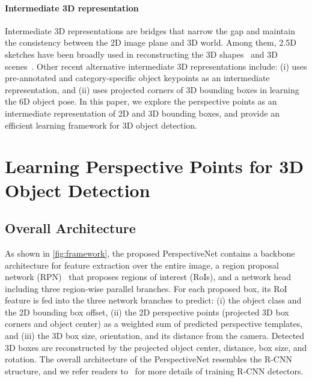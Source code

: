 \documentclass{article}
\begin{document}
\paragraph{Intermediate 3D representation}

Intermediate 3D representations are bridges that narrow the gap and maintain the consistency between the 2D image plane and 3D world. Among them, 2.5D sketches have been broadly used in reconstructing the 3D shapes~\cite{wu2017marrnet,von2018,genre2018} and 3D scenes~\cite{tulsiani2017factoring,huang2018holistic}. Other recent alternative intermediate 3D representations include: (i) \citet{wu2016single} uses pre-annotated and category-specific object keypoints as an intermediate representation, and (ii) \citet{tekin2018real} uses projected corners of 3D bounding boxes in learning the 6D object pose. In this paper, we explore the perspective points as an intermediate representation of 2D and 3D bounding boxes, and provide an efficient learning framework for 3D object detection.

\section{Learning Perspective Points for 3D Object Detection}

\subsection{Overall Architecture}

As shown in \autoref{fig:framework}, the proposed PerspectiveNet contains a backbone architecture for feature extraction over the entire image, a region proposal network (RPN)~\cite{ren2015faster} that proposes regions of interest (RoIs), and a network head including three region-wise parallel branches.
For each proposed box, its RoI feature is fed into the three network branches to predict: (i) the object class and the 2D bounding box offset, (ii) the 2D perspective points (projected 3D box corners and object center) as a weighted sum of predicted perspective templates, and (iii) the 3D box size, orientation, and its distance from the camera. Detected 3D boxes are reconstructed by the projected object center, distance, box size, and rotation.
The overall architecture of the PerspectiveNet resembles the R-CNN structure, and we refer readers to~\cite{ren2015faster,girshick2015fast,he2017mask} for more details of training R-CNN detectors.
\end{document}
